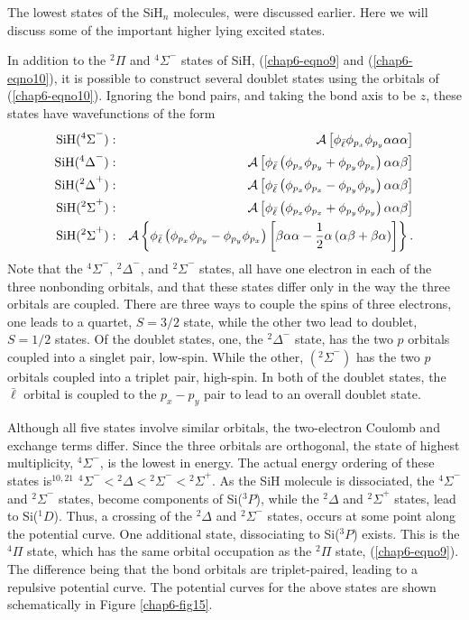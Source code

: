 The lowest states of the SiH$_n$ molecules, were discussed
earlier.  Here we will discuss some of the important
higher lying excited states.

In addition to the ${^2\Pi}$ and ${^4\Sigma}^-$ states of SiH,
(\ref{chap6-eqno9} and (\ref{chap6-eqno10}), it is possible to
construct several doublet states using the orbitals of
(\ref{chap6-eqno10}). Ignoring the bond pairs, and taking the bond
axis to be $z$, these states have wavefunctions of the form
\begin{eqnarray}
{\rm SiH} ( {^4\Sigma}^- ) &:& {\cal A} \left[ \phi_{\bar{\ell}} 
\phi_{p_x} \phi_{p_y} \alpha \alpha \alpha \right]\cr
{\rm SiH} ( {^4\Delta}^- ) &:& {\cal A} \left[ \phi_{\bar{\ell}} 
\left( \phi_{p_x} \phi_{p_y} + \phi_{p_y} \phi_{p_x} \right) \alpha \alpha 
\beta \right]\cr
{\rm SiH} ( {^2\Delta}^+ ) &:& {\cal A} \left[ \phi_{\bar{\ell}} 
\left( \phi_{p_x} \phi_{p_x} - \phi_{p_y} \phi_{p_y} \right) \alpha \alpha 
\beta \right]\cr
{\rm SiH} ( {^2\Sigma}^+ ) &:& {\cal A} \left[ \phi_{\bar{\ell}} 
\left( \phi_{p_x} \phi_{p_x} + \phi_{p_y} \phi_{p_y} \right) \alpha \alpha 
\beta \right]\cr
{\rm SiH} ( {^2\Sigma}^+ ) &:& {\cal A} \left\{ \phi_{\bar{\ell}} 
\left( \phi_{p_x} \phi_{p_y} - \phi_{p_y} \phi_{p_x} \right) \left[ 
\beta \alpha \alpha - {1 \over 2} \alpha \left( \alpha \beta + \beta 
\alpha \right) \right] \right\}.
\end{eqnarray}
Note that the ${^4\Sigma}^-$, ${^2\Delta}^-$, and ${^2\Sigma}^-$ 
states, all have one electron in each of the
three nonbonding orbitals, and that these states differ only 
in the way the three orbitals are coupled.  There are three ways to 
couple the spins of three electrons,
one leads to a quartet, $S = 3/2$ state, while the other two lead to doublet,
$S = 1/2$ states.  Of the doublet states, one, the ${^2\Delta}^-$ state, 
has the two $p$
orbitals coupled into a singlet pair, low-spin.  While the other, 
$({^2\Sigma}^-)$ has
the two $p$ orbitals coupled into a triplet pair, high-spin. In both of the
doublet states, the ${\bar{\ell}}$ orbital is coupled to the $p_x - 
p_y$ pair to lead to an overall doublet state.

Although all five states involve similar orbitals, the two-electron
Coulomb and exchange terms differ. Since the three orbitals are
orthogonal, the state of highest multiplicity, ${^4\Sigma}^-$, is the
lowest in energy. The actual energy ordering of these states
is$^{10,21}$ ${^4\Sigma}^- < {^2\Delta} < {^2\Sigma}^- <
{^2\Sigma}^+$.  As the SiH molecule is dissociated, the ${^4\Sigma}^-$
and ${^2\Sigma}^-$ states, become components of Si(${^3P}$), while the
${^2 \Delta}$ and ${^2\Sigma}^+$ states, lead to Si(${^1D}$).  Thus, a
crossing of the ${^2 \Delta}$ and ${^2\Sigma}^-$ states, occurs at
some point along the potential curve.  One additional state,
dissociating to Si(${^3P}$) exists. This is the ${^4\Pi}$ state, which
has the same orbital occupation as the ${^2\Pi}$ state,
(\ref{chap6-eqno9}).  The difference being that the bond orbitals are
triplet-paired, leading to a repulsive potential curve. The potential
curves for the above states are shown schematically in Figure
\ref{chap6-fig15}.

